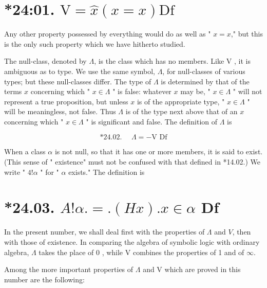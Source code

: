 \documentclass[10pt]{article}
\begin{document}
\section*{*24:01. $\mathrm{V}=\hat{x}(x=x) \mathrm{Df}$}
Any other property possessed by everything would do as well as " $x=x$," but this is the only such property which we have hitherto studied.

The null-class, denoted by $\Lambda$, is the class which has no members. Like V , it is ambiguous as to type. We use the same symbol, $\Lambda$, for null-classes of various types; but these null-classes differ. The type of $\Lambda$ is determined by that of the terms $x$ concerning which " $x \in \Lambda$ " is false: whatever $x$ may be, " $x \in \Lambda$ " will not represent a true proposition, but unless $x$ is of the appropriate type, " $x \in \Lambda$ " will be meaningless, not false. Thus $\Lambda$ is of the type next above that of an $x$ concerning which " $x \in \Lambda$ " is significant and false. The definition of $\Lambda$ is

$$
\text { *24.02. } \quad \Lambda=-\mathrm{V} \text { Df }
$$

When a class $\alpha$ is not null, so that it has one or more members, it is said to exist. (This sense of " existence" must not be confused with that defined in *14.02.) We write " $4!\alpha$ " for " $\alpha$ exists." The definition is

\section*{*24.03. $A!\alpha .=.(H x) . x \in \alpha$ Df}
In the present number, we shall deal first with the properties of $\Lambda$ and $V$, then with those of existence. In comparing the algebra of symbolic logic with ordinary algebra, $\Lambda$ takes the place of 0 , while V combines the properties of 1 and of $\infty$.

Among the more important properties of $\Lambda$ and V which are proved in this number are the following:
\end{document}
